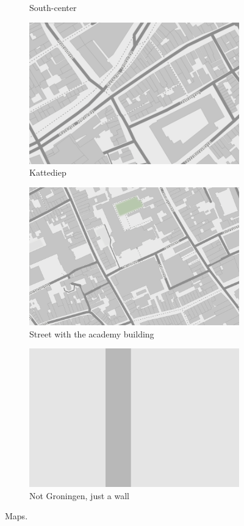 \begin{enumerate}
\begin{figure}[htbp]
\begin{center}
\begin{subfigure}{.5\textwidth}
\caption{South-center}
\end{subfigure}%
\begin{subfigure}{.5\textwidth}
\includegraphics[width=0.8\linewidth]{../experiments/GroteMarktMaps/maps/kattediep.png}
\caption{Kattediep}
\end{subfigure}
\begin{subfigure}{.5\textwidth}
\includegraphics[width=0.8\linewidth]{../experiments/GroteMarktMaps/maps/academy.png}
\caption{Street with the academy building}
\end{subfigure}%
\begin{subfigure}{.5\textwidth}
\includegraphics[width=0.8\linewidth]{../experiments/GroteMarktMaps/maps/wall.png}
\caption{Not Groningen, just a wall}
\end{subfigure}
\caption{Maps.}
\label{maps}
\end{center}
\end{figure}



\end{enumerate}
